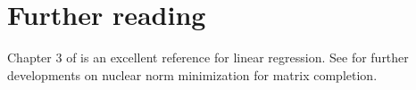 \documentclass[11pt,nocut]{article}
\begin{document}
\section*{Further reading}

Chapter 3 of \cite{friedman2001elements} is an excellent reference for linear regression.
See \cite{candes2009exact,candes2010matrix} for further developments on nuclear norm minimization for matrix completion.

\vspace{1cm}
\centerline{}




\end{document}
